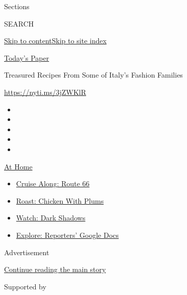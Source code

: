 Sections

SEARCH

\protect\hyperlink{site-content}{Skip to
content}\protect\hyperlink{site-index}{Skip to site index}

\href{https://myaccount.nytimes3xbfgragh.onion/auth/login?response_type=cookie\&client_id=vi}{}

\href{https://www.nytimes3xbfgragh.onion/section/todayspaper}{Today's
Paper}

Treasured Recipes From Some of Italy's Fashion Families

\url{https://nyti.ms/3jZWKlR}

\begin{itemize}
\item
\item
\item
\item
\item
\end{itemize}

\href{https://www.nytimes3xbfgragh.onion/spotlight/at-home?action=click\&pgtype=Article\&state=default\&region=TOP_BANNER\&context=at_home_menu}{At
Home}

\begin{itemize}
\tightlist
\item
  \href{https://www.nytimes3xbfgragh.onion/2020/09/07/travel/route-66.html?action=click\&pgtype=Article\&state=default\&region=TOP_BANNER\&context=at_home_menu}{Cruise
  Along: Route 66}
\item
  \href{https://www.nytimes3xbfgragh.onion/2020/09/04/dining/sheet-pan-chicken.html?action=click\&pgtype=Article\&state=default\&region=TOP_BANNER\&context=at_home_menu}{Roast:
  Chicken With Plums}
\item
  \href{https://www.nytimes3xbfgragh.onion/2020/09/04/arts/television/dark-shadows-stream.html?action=click\&pgtype=Article\&state=default\&region=TOP_BANNER\&context=at_home_menu}{Watch:
  Dark Shadows}
\item
  \href{https://www.nytimes3xbfgragh.onion/interactive/2020/at-home/even-more-reporters-editors-diaries-lists-recommendations.html?action=click\&pgtype=Article\&state=default\&region=TOP_BANNER\&context=at_home_menu}{Explore:
  Reporters' Google Docs}
\end{itemize}

Advertisement

\protect\hyperlink{after-top}{Continue reading the main story}

Supported by

